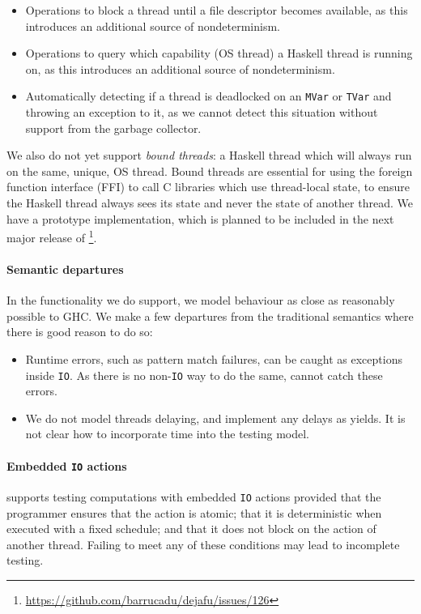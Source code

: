 \begin{itemize}
\item Operations to block a thread until a file descriptor becomes
  available, as this introduces an additional source of
  nondeterminism.

\item Operations to query which capability (OS thread) a Haskell
  thread is running on, as this introduces an additional source of
  nondeterminism.

\item Automatically detecting if a thread is deadlocked on an
  \verb|MVar| or \verb|TVar| and throwing an exception to it, as we
  cannot detect this situation without support from the garbage
  collector.
\end{itemize}

We also do not yet support \emph{bound threads}: a Haskell thread
which will always run on the same, unique, OS thread.  Bound threads
are essential for using the foreign function interface (FFI) to call C
libraries which use thread-local state, to ensure the Haskell thread
always sees its state and never the state of another thread.  We have
a prototype implementation, which is planned to be included in the
next major release of
\dejafu{}\footnote{\url{https://github.com/barrucadu/dejafu/issues/126}}.

\paragraph{Semantic departures}
In the functionality we do support, we model behaviour as close as
reasonably possible to GHC.  We make a few departures from the
traditional semantics where there is good reason to do so:

\begin{itemize}
\item Runtime errors, such as pattern match failures, can be caught as
  exceptions inside \verb|IO|.  As there is no non-\verb|IO| way to do
  the same, \dejafu{} cannot catch these errors.

\item We do not model threads delaying, and implement any delays as
  yields.  It is not clear how to incorporate time into the testing
  model.
\end{itemize}

\paragraph{Embedded \texttt{IO} actions}
\dejafu{} supports testing computations with embedded \verb|IO|
actions provided that the programmer ensures that the action is
atomic; that it is deterministic when executed with a fixed schedule;
and that it does not block on the action of another thread.  Failing
to meet any of these conditions may lead to incomplete testing.

